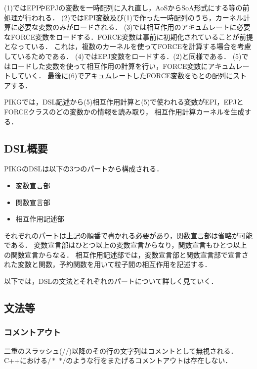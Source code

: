 \documentclass{article}
\begin{document}
(1)ではEPIやEPJの変数を一時配列に入れ直し，AoSからSoA形式にする等の前処理が行われる．
(2)ではEPI変数及び(1)で作った一時配列のうち，カーネル計算に必要な変数のみがロードされる．
(3)では相互作用のアキュムレートに必要なFORCE変数をロードする．FORCE変数は事前に初期化されていることが前提となっている．
これは，複数のカーネルを使ってFORCEを計算する場合を考慮しているためである．
(4)ではEPJ変数をロードする．(2)と同様である．
(5)ではロードした変数を使って相互作用の計算を行い，FORCE変数にアキュムレートしていく．
最後に(6)でアキュムレートしたFORCE変数をもとの配列にストアする．

PIKGでは，DSL記述から(5)相互作用計算と(5)で使われる変数がEPI，EPJとFORCEクラスのどの変数かの情報を読み取り，
相互作用計算カーネルを生成する．

\subsection{DSL概要}
PIKGのDSLは以下の3つのパートから構成される．
 \begin{itemize}
  \item 変数宣言部
  \item 関数宣言部
  \item 相互作用記述部
 \end{itemize}
 それぞれのパートは上記の順番で書かれる必要があり，関数宣言部は省略が可能である．
 変数宣言部はひとつ以上の変数宣言からなり，関数宣言もひとつ以上の関数宣言からなる．
 相互作用記述部では，変数宣言部と関数宣言部で宣言された変数と関数，予約関数を用いて粒子間の相互作用を記述する．

 以下では，DSLの文法とそれぞれのパートについて詳しく見ていく．

 \subsection{文法等}
 \subsubsection{コメントアウト}
 二重のスラッシュ(//)以降のその行の文字列はコメントとして無視される．C++における$/*$ $*/$のような行をまたげるコメントアウトは存在しない．
\end{document}

